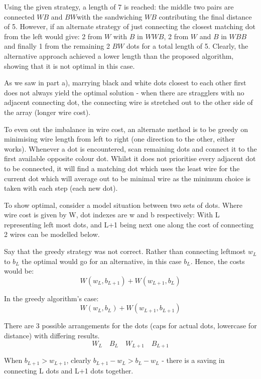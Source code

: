 \documentclass[11pt, a4paper]{article}
\begin{document}
{{{Using the given strategy, a length of 7 is reached: the middle two pairs are connected $WB$ and $BW$with the sandwiching $WB$ contributing the final distance of 5. However, if an alternate strategy of just connecting the closest matching dot from the left would give:
2 from $W$ with $B$ in $WWB$, 2 from $W$ and $B$ in $WBB$ and finally 1 from the remaining 2 $BW$ dots for a total length of 5. Clearly, the alternative approach achieved a lower length than the proposed algorithm, showing that it is not optimal in this case.
 

As we saw in part a), marrying black and white dots closest to each other first does not always yield the optimal solution - when there are stragglers with no adjacent connecting dot, the connecting wire is stretched out to the other side of the array (longer wire cost).

To even out the imbalance in wire cost, an alternate method is to be greedy on minimising wire length from left to right (one direction to the other, either works). Whenever a dot is encountered, scan remaining dots and connect it to the first available opposite colour dot.
Whilst it does not prioritise every adjacent dot to be connected, it will find a matching dot which uses the least wire for the current dot which will average out to be minimal wire as the minimum choice is taken with each step (each new dot).

To show optimal, consider a model situation between two sets of dots.
Where wire cost is given by W, dot indexes are w and b respectively:
With L representing left most dots, and L+1 being next one along the cost of connecting 2 wires can be modelled below.

Say that the greedy strategy was not correct. Rather than connecting leftmost $w_L$ to $b_L$ the optimal would go for an alternative, in this case $b_L$. Hence, the costs would be:
\[ W(w_L,b_{L+1}) + W(w_{L+1}, b_L)\] 

In the greedy algorithm's case:
\[ W(w_L,b_L) + W(w_{L+1}, b_{L+1}) \]

There are 3 possible arrangements for the dots (caps for actual dots, lowercase for distance) with differing results.
\[ W_L \quad B_L \quad W_{L+1} \quad B_{L+1} \]

When $b_{L+1} > w_{L+1}$, clearly $b_{L+1} - w_{L} > b_L - w_L$ - there is a saving in connecting L dots and L+1 dots together.

}}}
\end{document}

